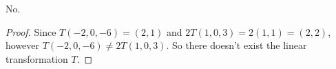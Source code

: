 \begin{Exercise}
\begin{answer}
No.
\end{answer}
\begin{proof}
Since $T(-2,0,-6) = (2,1)$ and $2T(1,0,3) = 2(1,1) = (2,2)$, however $T(-2,0,-6) \neq 2T(1,0,3)$. So there doesn't exist the linear transformation $T$.
\end{proof}
\end{Exercise}